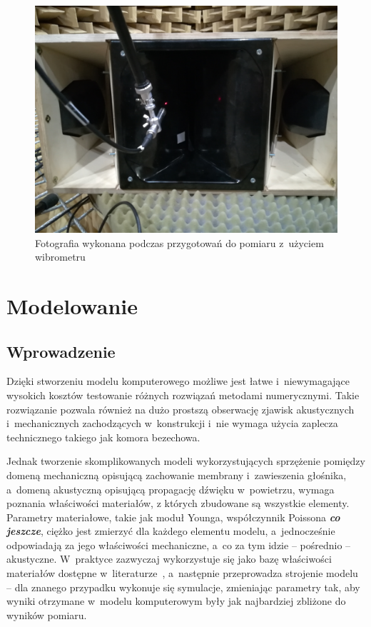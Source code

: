 \documentclass[12pt]{oska}
\newcommand{\comment}[1]{{\color{magenta}\emph{\textbf{#1}}}}
\begin{document}
			\begin{figure}[!ht]
				\centering
				\includegraphics[width=.8\textwidth]{zdjecie_wibro.jpg}
				\caption{Fotografia wykonana podczas przygotowań do pomiaru z~użyciem wibrometru}
				\label{r:wibro_zdjecie}
			\end{figure}


\section{Modelowanie}
	
	\subsection{Wprowadzenie}
	
		Dzięki stworzeniu modelu komputerowego możliwe jest łatwe i~niewymagające wysokich kosztów testowanie różnych rozwiązań metodami numerycznymi. Takie rozwiązanie pozwala również na dużo prostszą obserwację zjawisk akustycznych i~mechanicznych zachodzących w~konstrukcji i~nie wymaga użycia zaplecza technicznego takiego jak komora bezechowa. 
		
		Jednak tworzenie skomplikowanych modeli wykorzystujących sprzężenie pomiędzy domeną mechaniczną opisującą zachowanie membrany i~zawieszenia głośnika, a~domeną akustyczną opisującą propagację dźwięku w~powietrzu, wymaga poznania właściwości materiałów, z których zbudowane są wszystkie elementy. Parametry materiałowe, takie jak moduł Younga, współczynnik Poissona \comment{co jeszcze}, ciężko jest zmierzyć dla każdego elementu modelu, a~jednocześnie odpowiadają za jego właściwości mechaniczne, a~co za tym idzie -- pośrednio -- akustyczne. W~praktyce zazwyczaj wykorzystuje się jako bazę właściwości materiałów dostępne w~literaturze~\cite{modelowanie}, a~następnie przeprowadza strojenie modelu -- dla znanego przypadku wykonuje się symulacje, zmieniając parametry tak, aby wyniki otrzymane w~modelu komputerowym były jak najbardziej zbliżone do wyników pomiaru.
		
\end{document}
